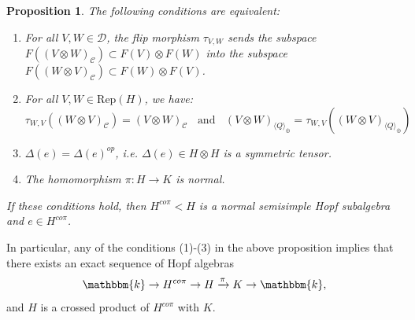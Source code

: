 \documentclass{amsart}
\theoremstyle{plain}%
\newtheorem{prop}[lemma]{Proposition}
\theoremstyle{remark}
\newcommand{\C}{\mathcal{C}}
\newcommand{\1}{\mathbbm{1}}
\newcommand{\D}{\mathcal{D}}
\newcommand{\Rep}{\mathrm{Rep}}
\newcommand{\kk}{\mathbbm{k}}
\begin{document}
\begin{prop}\label{prop: exact sequence of Hopf algebras}
    The following conditions are equivalent: 
    \begin{enumerate}
        \item For all $V,W\in \D$, the flip morphism $\tau_{V, W}$ sends the subspace $F((V\otimes W)_\C) \subset F(V)\otimes F(W)$ into the subspace $F((W\otimes V)_{\C}) \subset F(W)\otimes F(V)$.
        \item For all $V, W\in \Rep(H)$, we have: $$\tau_{W, V}\left((W\otimes V)_{\mathcal{C}}\right)=(V\otimes W)_{\C} \;\;\text{ and } \;\;(V\otimes W)_{\langle Q\rangle_{\oplus}}=\tau_{W, V}\left((W\otimes V)_{\langle Q\rangle_{\oplus}}\right)$$ 
        \item $\Delta(e)=\Delta(e)^{op}$, i.e. $\Delta(e)\in H\otimes H$ is a symmetric tensor.
    
        \item The homomorphism $\pi: H\to K$ is normal.
    \end{enumerate}   

If these conditions hold, then $H^{co \pi}<H$ is a normal semisimple Hopf subalgebra and $e\in H^{co \pi}$.
\end{prop}
  

          In particular, any of the conditions (1)-(3) in the above proposition implies that there exists an exact sequence of Hopf algebras
        $$
            \kk\to H^{co \pi}\to H\xrightarrow{\pi} K\to \kk,
        $$
        and $H$ is a crossed product of $H^{co \pi}$ with $K$.
\end{document}
